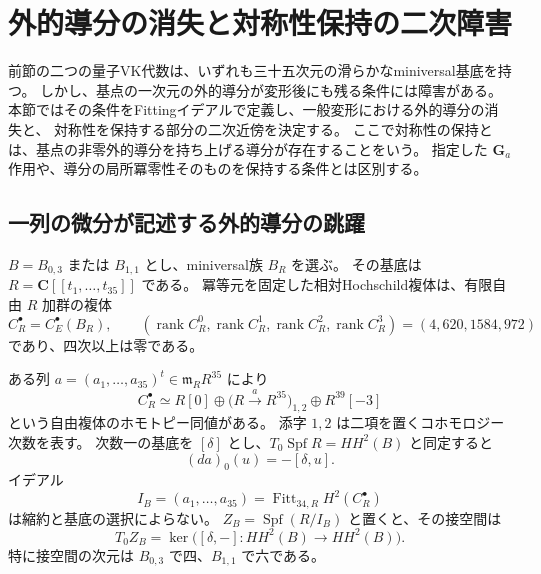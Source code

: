 \section{外的導分の消失と対称性保持の二次障害}
\label{sec:vk-symmetry-jump-v37}

前節の二つの量子VK代数は、いずれも三十五次元の滑らかなminiversal基底を持つ。
しかし、基点の一次元の外的導分が変形後にも残る条件には障害がある。
本節ではその条件をFittingイデアルで定義し、一般変形における外的導分の消失と、
対称性を保持する部分の二次近傍を決定する。
ここで対称性の保持とは、基点の非零外的導分を持ち上げる導分が存在することをいう。
指定した $\mathbf G_a$ 作用や、導分の局所冪零性そのものを保持する条件とは区別する。

\subsection{一列の微分が記述する外的導分の跳躍}

$B=B_{0,3}$ または $B_{1,1}$ とし、miniversal族 $B_R$ を選ぶ。
その基底は $R=\mathbf C[[t_1,\ldots,t_{35}]]$ である。
冪等元を固定した相対Hochschild複体は、有限自由 $R$ 加群の複体
\[
 C_R^\bullet=C_E^\bullet(B_R),\qquad
 (\operatorname{rank}C_R^0,\operatorname{rank}C_R^1,
 \operatorname{rank}C_R^2,\operatorname{rank}C_R^3)=(4,620,1584,972)
\]
であり、四次以上は零である。

\begin{theorem}[外的導分の跳躍を定める一列]
\label{thm:vk-jump-column-v37}
ある列 $a=(a_1,\ldots,a_{35})^t\in\mathfrak m_R R^{35}$ により
\begin{equation}
 C_R^\bullet\simeq
 R[0]\oplus
 \bigl(R\xrightarrow{\ a\ }R^{35}\bigr)_{1,2}
 \oplus R^{39}[-3]
 \label{eq:vk-minimal-relative-complex-v37}
\end{equation}
という自由複体のホモトピー同値がある。
添字 $1,2$ は二項を置くコホモロジー次数を表す。
次数一の基底を $[\delta]$ とし、$T_0\operatorname{Spf}R=HH^2(B)$ と同定すると
\[
 (da)_0(u)=-[\delta,u].
\]
イデアル
\begin{equation}
 I_B=(a_1,\ldots,a_{35})
     =\operatorname{Fitt}_{34,R}H^2(C_R^\bullet)
 \label{eq:vk-symmetry-Fitting-v37}
\end{equation}
は縮約と基底の選択によらない。
$Z_B=\operatorname{Spf}(R/I_B)$ と置くと、その接空間は
\[
 T_0Z_B=\ker\bigl([\delta,-]:HH^2(B)\to HH^2(B)\bigr).
\]
特に接空間の次元は $B_{0,3}$ で四、$B_{1,1}$ で六である。
\end{theorem}

